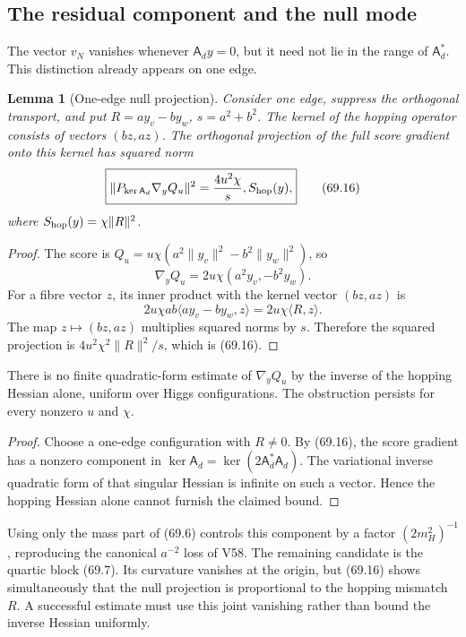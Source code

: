 \documentclass[11pt]{article}
\newtheorem{lemma}[theorem]{Lemma}
\theoremstyle{remark}
\begin{document}
\subsection{The residual component and the null mode}

The vector \(v_N\) vanishes whenever \(\mathsf A_dy=0\), but it need
not lie in the range of \(\mathsf A_d^*\).  This distinction already
appears on one edge.

\begin{lemma}[One-edge null projection]
\label{lem:v17v69-null}
Consider one edge, suppress the orthogonal transport, and put
\(R=a y_v-b y_w\), \(s=a^2+b^2\).  The kernel of the hopping
operator consists of vectors \((bz,az)\).  The orthogonal projection
of the full score gradient onto this kernel has squared norm
\[
\boxed{
 \|P_{\ker\mathsf A_d}\nabla_yQ_u\|^2
 =\frac{4u^2\chi}{s},S_{\rm hop}(y),}            \tag{69.16}
\]
where \(S_{\rm hop}(y)=\chi\|R\|^2\).
\end{lemma}

\begin{proof}
The score is
\(Q_u=u\chi(a^2\|y_v\|^2-b^2\|y_w\|^2)\), so
\[
 \nabla_yQ_u=2u\chi(a^2y_v,-b^2y_w).             \tag{69.17}
\]
For a fibre vector \(z\), its inner product with the kernel vector
\((bz,az)\) is
\[
 2u\chi ab\langle ay_v-by_w,z\rangle
 =2u\chi\langle R,z\rangle.                     \tag{69.18}
\]
The map \(z\mapsto(bz,az)\) multiplies squared norms by \(s\).
Therefore the squared projection is
\(4u^2\chi^2\|R\|^2/s\), which is (69.16).
\end{proof}

\begin{countertheorem}
\label{ctr:v17v69-null}
There is no finite quadratic-form estimate of
\(\nabla_yQ_u\) by the inverse of the hopping Hessian alone, uniform
over Higgs configurations.  The obstruction persists for every
nonzero \(u\) and \(\chi\).
\end{countertheorem}

\begin{proof}
Choose a one-edge configuration with \(R\neq0\).  By (69.16), the
score gradient has a nonzero component in
\(\ker\mathsf A_d=\ker(2\mathsf A_d^*\mathsf A_d)\).  The variational
inverse quadratic form of that singular Hessian is infinite on such a
vector.  Hence the hopping Hessian alone cannot furnish the claimed
bound.
\end{proof}

Using only the mass part of (69.6) controls this component by a factor
\((2m_H^2)^{-1}\), reproducing the canonical \(a^{-2}\) loss of V58.
The remaining candidate is the quartic block (69.7).  Its curvature
vanishes at the origin, but (69.16) shows simultaneously that the
null projection is proportional to the hopping mismatch \(R\).  A
successful estimate must use this joint vanishing rather than bound
the inverse Hessian uniformly.
\end{document}

